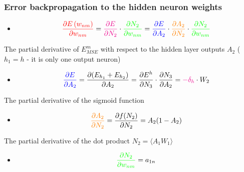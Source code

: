 \documentclass[proffesionalfonts]{beamer}
\begin{document}
\begin{frame}
\frametitle{Error backpropagation to the hidden neuron weights}
\begin{block}{}
\begin{itemize}
\item[\ ]
\[ \textcolor{red}{\frac{\partial E \left( w_{nm} \right) }{ \partial w_{nm} }} = \textcolor{magenta}{\frac{\partial E }{ \partial N_2 }} \cdot \textcolor{green}{\frac{ \partial N_2 }{ \partial w_{nm} }} = \textcolor{blue}{\frac{ \partial E }{ \partial A_2 }} \cdot \textcolor{orange}{\frac{ \partial A_2 }{ \partial N_2 }} \cdot \textcolor{green}{\frac{ \partial N_2 }{ \partial w_{nm} }} \]
\end{itemize}
\end{block}
\begin{block}{The partial derivative of $E_{MSE}^m$ with respect to the hidden layer outputs $A_2$ ($h_1=h$ - it is only one output neuron)}
\begin{itemize}
\item[\ ]  
\[ \textcolor{blue}{\frac{ \partial E }{ \partial A_2 }} = \frac{\partial (E_{h_1} + E_{h_2})}{\partial A_2} = \frac{\partial E^h }{ \partial N_3 } \cdot \frac{ \partial N_3 }{ \partial A_2 } = \textcolor{magenta}{- \delta_h} \cdot W_2 \]
\end{itemize}
\end{block}
\begin{block}{The partial derivative of the sigmoid function }
\begin{itemize}
\item[\ ]
\[ \textcolor{orange}{\frac{ \partial A_2 }{ \partial N_2 }} = \frac{ \partial f(N_2) }{ \partial N_2 } = A_2(1 - A_2) \]
\end{itemize}
\end{block}
\begin{block}{The partial derivative of the dot product $N_2 = \langle A_1 W_1 \rangle$}
\begin{itemize}
\item[\ ]
\[ \textcolor{green}{\frac{ \partial N_2 }{ \partial w_{nm} }} = a_{1n} \]
\end{itemize}
\end{block}
\end{frame}
\end{document}
